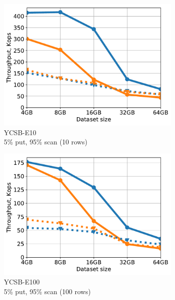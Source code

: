 \begin{figure}[tb]
\begin{subfigure}{0.33\linewidth}
\includegraphics[width=\textwidth]{figs/Workload_E-_line.pdf}
\caption{YCSB-E10 \\ 5\% put, 95\% scan (10 rows)}
\label{fig:throughput:e10}
\end{subfigure}
\begin{subfigure}{0.33\linewidth}
\includegraphics[width=\textwidth]{figs/Workload_E_line.pdf}
\caption{YCSB-E100 \\ 5\% put, 95\% scan (100 rows)}
\label{fig:throughput:e100}
\end{subfigure}
\begin{subfigure}{0.33\linewidth}

\end{subfigure}
\end{figure}
